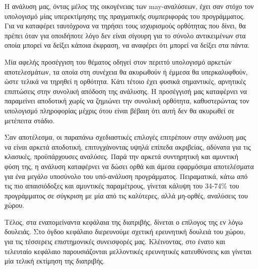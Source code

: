 Η ανάλυση μας, όντας μέλος της οικογένειας των {\en may}-αναλύσεων, έχει σαν στόχο τον υπολογισμό μίας υπερεκτίμησης της πραγματικής συμπεριφοράς του προγράμματος. Για να καταφέρει ταυτόχρονα να τηρήσει τους ισχυρισμούς ορθότητας που δίνει, θα πρέπει όταν για οποιδήποτε λόγο δεν είναι σίγουρη για το σύνολο αντικειμένων στα οποία μπορεί να δείξει κάποια έκφραση, να αναφέρει ότι μπορεί να δείξει στα πάντα.

Μία αφελής προσέγγιση του θέματος οδηγεί στον περιττό υπολογισμό αρκετών αποτελεσμάτων, τα οποία στη συνέχεια θα ακυρωθούν ή έμμεσα θα υπερκαλυφθούν, ώστε τελικά να τηρηθεί η ορθότητα. Κάτι τέτοιο έχει φυσικά σημαντικές, αρνητικές επιπτώσεις στην συνολική απόδοση της ανάλυσης. Η προσέγγισή μας καταφέρνει να παραμείνει αποδοτική χωρίς να ζημιώνει την συνολική ορθότητα, καθυστερώντας τον υπολογισμό πληροφορίας μέχρις ότου είναι βέβαιη ότι αυτή δεν θα ακυρωθεί σε μετέπειτα στάδιο.

Σαν αποτέλεσμα, οι παραπάνω σχεδιαστικές επιλογές επιτρέπουν στην ανάλυση μας να είναι αρκετά αποδοτική, επιτυγχάνοντας υψηλά επίπεδα ακριβείας, αδύνατα για τις κλασικές, προϋπάρχουσες αναλύσες. Παρά την αρκετά συντηρητική και αμυντική φύση της, η ανάλυση καταφέρνει να δώσει ορθά και άμεσα εφαρμόσιμα αποτελέσματα για ένα μεγάλο υποσύνολο του υπό-ανάλυση προγράμματος. Πειραματικά, κάτω από τις πιο απαισιόδοξες και αμυντικές παραμέτρους, γίνεται κάλυψη του 34-74\% του προγράμματος σε σύγκριση με μία από τις καλύτερες, αλλά μη-ορθές, αναλύσεις του χώρου.


\vspace{5 mm}
Τέλος, στα εναπομείναντα κεφάλαια της διατριβής, δίνεται ο επίλογος της εν λόγω δουλειάς. Στο όγδοο κεφάλαιο διερευνούμε σχετική ερευνητική δουλειά του χώρου, για τις τέσσερεις επιστημονικές συνεισφορές μας. Κλέινοντας, στο ένατο και τελευταίο κεφάλαιο παρουσιάζονται μελλοντικές ερευνητικές κατευθύνσεις και γίνεται μία τελική εκτίμηση της διατριβής.
